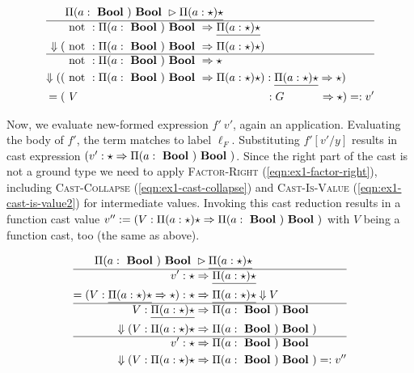 \begin{align}
& \Pi(a:\Bool) \Bool \rhd \underline{\Pi(a:\star) \star} \\ \hline
& \notf : \Pi(a:\Bool) \Bool \Rightarrow \underline{\Pi(a:\star) \star} \\
\Downarrow ( & \notf : \Pi(a:\Bool) \Bool \Rightarrow \Pi(a:\star) \star ) \label{eqn:ex1-cast-is-value} \\ \hline
& \notf : \Pi(a:\Bool) \Bool \Rightarrow \star \\
\Downarrow (( & \notf : \Pi(a:\Bool) \Bool \Rightarrow \Pi(a:\star) \star) : \underline{\Pi(a:\star) \star} \Rightarrow \star) \label{eqn:ex1-factor-left} \\
= (& ~V \hspace{16.6em} : G \hspace{3.1em} \Rightarrow \star) =: v'
\end{align}

Now, we evaluate new-formed expression $f'~v'$, again an application. Evaluating the body of $f'$, the \case term matches to label $\ell_F$. Substituting $f'[v'/y]$ results in cast expression $(v' : \star \Rightarrow \Pi(a:\text{ \textbf{Bool} }) \text{ \textbf{Bool} })$. Since the right part of the cast is not a ground type we need to apply \textsc{Factor-Right} (\ref{eqn:ex1-factor-right}), including \textsc{Cast-Collapse} (\ref{eqn:ex1-cast-collapse}) and \textsc{Cast-Is-Value} (\ref{eqn:ex1-cast-is-value2}) for intermediate values. Invoking this cast reduction results in a function cast value $v'' := (V : \Pi(a: \star) \star \Rightarrow \Pi(a:\text{ \textbf{Bool} }) \text{ \textbf{Bool} })$ with $V$ being a function cast, too (the same as above).

\begin{align}
\Pi(a:\text{ \textbf{Bool} }) \text{ \textbf{Bool} } & \rhd \underline{\Pi(a:\star)\star} \\ \hline
v' : \star & \Rightarrow \underline{\Pi(a:\star)\star} \\
= ( V : \underline{\Pi(a:\star) \star} \Rightarrow \star) : \star & \Rightarrow \underline{\Pi(a:\star) \star}
\Downarrow V \label{eqn:ex1-cast-collapse} \\ \hline
V : \underline{\Pi(a:\star) \star} & \Rightarrow \Pi(a:\text{ \textbf{Bool} }) \text{ \textbf{Bool} } \\
\Downarrow (V : \Pi(a:\star) \star & \Rightarrow \Pi(a:\text{ \textbf{Bool} }) \text{ \textbf{Bool} }) \label{eqn:ex1-cast-is-value2} \\ \hline
v' : \star & \Rightarrow \Pi(a:\text{ \textbf{Bool} }) \text{ \textbf{Bool} } \\
\Downarrow (V : \Pi(a:\star) \star & \Rightarrow \Pi(a:\text{ \textbf{Bool} }) \text{ \textbf{Bool} }) =: v'' \label{eqn:ex1-factor-right}
\end{align}

